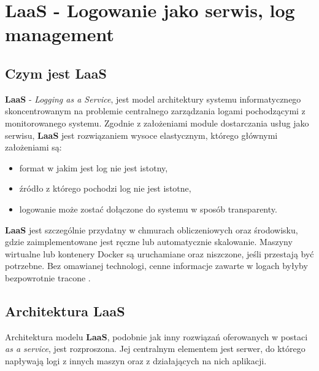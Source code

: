 \section{\textbf{LaaS} - Logowanie jako serwis, log management}
\label{chapter:monitoring_architecture:laas}

    \subsection{Czym jest \textbf{LaaS}}
    \textbf{LaaS} - \textit{Logging as a Service}, jest model architektury systemu informatycznego
    skoncentrowanym na problemie centralnego zarządzania logami pochodzącymi z monitorowanego systemu.
    Zgodnie z założeniami module dostarczania usług jako serwisu, \textbf{LaaS} jest rozwiązaniem
    wysoce elastycznym, którego głównymi założeniami są:
    \begin{itemize}
        \item format w jakim jest log nie jest istotny,
        \item źródło z którego pochodzi log nie jest istotne,
        \item logowanie może zostać dołączone do systemu w sposób transparenty.
    \end{itemize}
    
    \textbf{LaaS} jest szczególnie przydatny w chmurach obliczeniowych oraz
    środowisku, gdzie zaimplementowane jest ręczne lub automatycznie skalowanie.
    Maszyny wirtualne lub kontenery Docker są uruchamiane oraz niszczone, jeśli
    przestają być potrzebne. Bez omawianej technologi, cenne informacje zawarte w logach
    byłyby bezpowrotnie tracone \cite{log_management_explained}. 
    
    \subsection{Architektura LaaS}
    Architektura modelu \textbf{LaaS}, podobnie jak inny rozwiązań oferowanych w postaci \textit{as a service},
    jest rozproszona. Jej centralnym elementem jest serwer, do którego napływają logi
    z innych maszyn oraz z działających na nich aplikacji.
    
